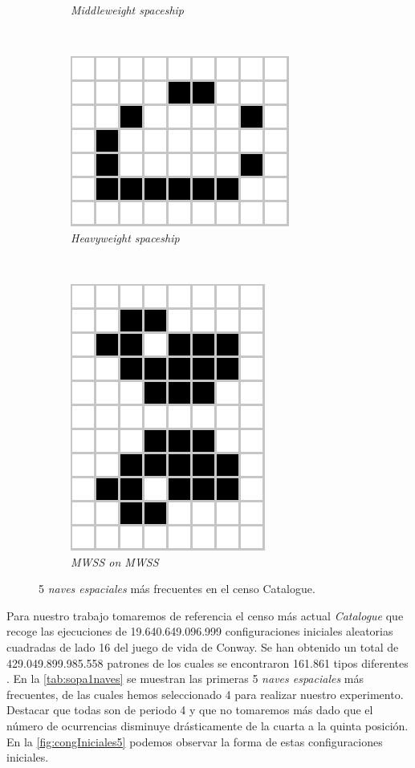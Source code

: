 \documentclass[../proyecto.tex]{memoir}
\begin{document}
\begin{figure}[H]
\begin{subfigure}[b]{0.3\linewidth}
        \caption{\textit{Middleweight spaceship}}
        \label{fig:middleweightspaceship}
    \end{subfigure}
    \\
	\begin{subfigure}[b]{0.3\linewidth} 
        \centering
        \includegraphics[height=0.45\linewidth]{./images/heavyweightspaceship.png}
        \caption{\textit{Heavyweight spaceship}}
        \label{fig:heavyweightspaceship}
    \end{subfigure}
    \
	\begin{subfigure}[b]{0.3\linewidth} 
        \centering
        \includegraphics[height=0.65\linewidth]{./images/MWSS_on_MWSS.png}
        \caption{\textit{MWSS on MWSS}}
        \label{fig:mwss2}
    \end{subfigure}
	\caption{5 \textit{naves espaciales} más frecuentes en el censo {Catalogue}.}
	\label{fig:congIniciales5}
\end{figure} 


Para nuestro trabajo tomaremos de referencia el censo más actual \textit{Catalogue} que recoge las ejecuciones de 19.640.649.096.999 configuraciones iniciales aleatorias cuadradas de lado 16 del juego de vida de Conway. Se han obtenido un total de 429.049.899.985.558 patrones de los cuales se encontraron 161.861 tipos diferentes \cite{sopa3}. En la \autoref{tab:sopa1naves} se muestran las primeras 5 \textit{naves espaciales} más frecuentes, de las cuales hemos seleccionado 4 para realizar nuestro experimento. Destacar que todas son de periodo 4 y que no tomaremos más dado que el número de ocurrencias disminuye drásticamente de la cuarta a la quinta posición. En la \autoref{fig:congIniciales5} podemos observar la forma de estas configuraciones iniciales. 
\end{document}
